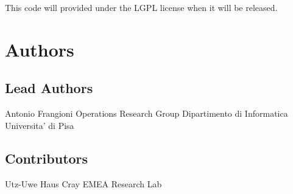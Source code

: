 This code will provided under the L\+G\+PL license when it will be released.

\section*{Authors }

\subsection*{Lead Authors }

\begin{DoxyVerb}Antonio Frangioni
Operations Research Group
Dipartimento di Informatica
Universita' di Pisa
\end{DoxyVerb}


\subsection*{Contributors }

\begin{DoxyVerb}Utz-Uwe Haus
Cray EMEA Research Lab\end{DoxyVerb}
 